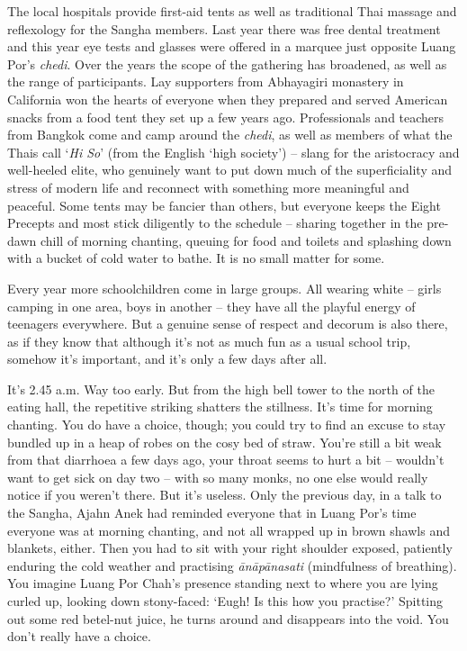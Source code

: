 The local hospitals provide first-aid tents as well as traditional Thai
massage and reflexology for the Sangha members. Last year there was free
dental treatment and this year eye tests and glasses were offered in a
marquee just opposite Luang Por's \emph{chedi}. Over the years the scope
of the gathering has broadened, as well as the range of participants. 
Lay supporters from Abhayagiri monastery in California won the hearts of
everyone when they prepared and served American snacks from a food tent
they set up a few years ago. Professionals and teachers from Bangkok
come and camp around the \emph{chedi}, as well as members of what the
Thais call `\emph{Hi So}' (from the English `high society') -- slang for
the aristocracy and well-heeled elite, who genuinely want to put down
much of the superficiality and stress of modern life and reconnect with
something more meaningful and peaceful. Some tents may be fancier than
others, but everyone keeps the Eight Precepts and most stick diligently
to the schedule -- sharing together in the pre-dawn chill of morning
chanting, queuing for food and toilets and splashing down with a bucket
of cold water to bathe. It is no small matter for some. 

Every year more schoolchildren come in large groups. All wearing white
-- girls camping in one area, boys in another -- they have all the
playful energy of teenagers everywhere. But a genuine sense of respect
and decorum is also there, as if they know that although it's not as
much fun as a usual school trip, somehow it's important, and it's only a
few days after all. 

It's 2.45 a.m. Way too early. But from the high bell tower to the north
of the eating hall, the repetitive striking shatters the stillness. It's
time for morning chanting. You do have a choice, though; you could try
to find an excuse to stay bundled up in a heap of robes on the cosy bed
of straw. You're still a bit weak from that diarrhoea a few days ago, 
your throat seems to hurt a bit -- wouldn't want to get sick on day two
-- with so many monks, no one else would really notice if you weren't
there. But it's useless. Only the previous day, in a talk to the Sangha,
Ajahn Anek had reminded everyone that in Luang Por's time everyone was
at morning chanting, and not all wrapped up in brown shawls and
blankets, either. Then you had to sit with your right shoulder exposed, 
patiently enduring the cold weather and practising \emph{ānāpānasati}
 (mindfulness of breathing). You imagine Luang Por Chah's presence
standing next to where you are lying curled up, looking down
stony-faced: `Eugh! Is this how you practise?' Spitting out some red
betel-nut juice, he turns around and disappears into the void. You don't
really have a choice. 

